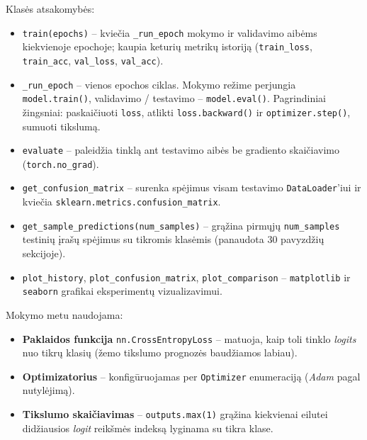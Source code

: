 Klasės atsakomybės:
\begin{itemize}
    \item \texttt{train(epochs)} – kviečia \texttt{\_run\_epoch} mokymo ir validavimo aibėms kiekvienoje epochoje; kaupia keturių metrikų istoriją (\texttt{train\_loss}, \texttt{train\_acc}, \texttt{val\_loss}, \texttt{val\_acc}).
    \item \texttt{\_run\_epoch} – vienos epochos ciklas. Mokymo režime perjungia \texttt{model.train()}, validavimo / testavimo – \texttt{model.eval()}. Pagrindiniai žingsniai: paskaičiuoti \texttt{loss}, atlikti \texttt{loss.backward()} ir \texttt{optimizer.step()}, sumuoti tikslumą.
    \item \texttt{evaluate} – paleidžia tinklą ant testavimo aibės be gradiento skaičiavimo (\texttt{torch.no\_grad}).
    \item \texttt{get\_confusion\_matrix} – surenka spėjimus visam testavimo \texttt{DataLoader}'iui ir kviečia \texttt{sklearn.metrics.confusion\_matrix}.
    \item \texttt{get\_sample\_predictions(num\_samples)} – grąžina pirmųjų \texttt{num\_samples} testinių įrašų spėjimus su tikromis klasėmis (panaudota $30$ pavyzdžių sekcijoje).
    \item \texttt{plot\_history}, \texttt{plot\_confusion\_matrix}, \texttt{plot\_comparison} – \texttt{matplotlib} ir \texttt{seaborn} grafikai eksperimentų vizualizavimui.
\end{itemize}

Mokymo metu naudojama:
\begin{itemize}
    \item \textbf{Paklaidos funkcija} \texttt{nn.CrossEntropyLoss} – matuoja, kaip toli tinklo \textit{logits} nuo tikrų klasių (žemo tikslumo prognozės baudžiamos labiau).
    \item \textbf{Optimizatorius} – konfigūruojamas per \texttt{Optimizer} enumeraciją (\textit{Adam} pagal nutylėjimą).
    \item \textbf{Tikslumo skaičiavimas} – \texttt{outputs.max(1)} grąžina kiekvienai eilutei didžiausios \textit{logit} reikšmės indeksą lyginama su tikra klase.
\end{itemize}
